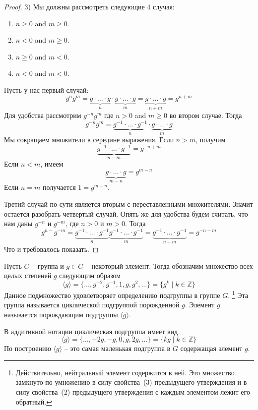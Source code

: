 \begin{proof}
3) Мы должны рассмотреть следующие $4$ случая:
\begin{enumerate}
\item $n\geqslant 0$ and $m\geqslant 0$.

\item $n < 0$ and $m\geqslant 0$.

\item $n\geqslant 0$ and $m < 0$.

\item $n < 0$ and $m < 0$.
\end{enumerate}
Пусть у нас первый случай:
\[
g^n g^m = \underbrace{g\cdot \ldots \cdot g}_n\cdot\underbrace{g\cdot \ldots \cdot g}_m = \underbrace{g\cdot \ldots \cdot g}_{n+m} = g^{n+m}
\]
Для удобства рассмотрим $g^{-n} g^{m}$ где $n>0$ and $m\geqslant 0$ во втором случае.
Тогда
\[
g^{-n}g^{m} = \underbrace{g^{-1}\cdot \ldots \cdot g^{-1}}_{n}\cdot\underbrace{g\cdot \ldots \cdot g}_m
\]
Мы сокращаем множители в середине выражения.
Если $n >m$, получим
\[
\underbrace{g^{-1}\cdot \ldots \cdot g^{-1}}_{n - m} = g^{-n + m}
\]
Если $n < m$, имеем
\[
\underbrace{g\cdot \ldots \cdot g}_{m - n} = g^{m - n}
\]
Если $n = m$ получается $1 = g^{m - n}$.

Третий случай по сути является вторым с переставленными множителями.
Значит остается разобрать четвертый случай.
Опять же для удобства будем считать, что нам даны $g^{-n}$ и $g^{-m}$, где $n>0$ и $m > 0$.
Тогда
\[
g^{n-} g^{-m} = \underbrace{g^{-1}\cdot \ldots \cdot g^{-1}}_{n}\underbrace{g^{-1}\cdot \ldots \cdot g^{-1}}_{m} = \underbrace{g^{-1}\cdot \ldots \cdot g^{-1}}_{n + m} = g^{-n - m}
\]
Что и требовалось показать.
\end{proof}


\begin{definition}
Пусть $G$ -- группа и $g\in G$ -- некоторый элемент.
Тогда обозначим множество всех целых степеней $g$ следующим образом
\[
\langle g \rangle = \{ \ldots, g^{-2},g^{-1},1, g, g^2, \ldots\} = \{g^k \mid k\in \mathbb Z\}
\]
Данное подмножество удовлетворяет определению подгруппы в группе $G$.%
\footnote{Действительно, нейтральный элемент содержится в ней.
Это множество замкнуто по умножению в силу свойства~(3) предыдущего утверждения и в силу свойства~(2) предыдущего утверждения с каждым элементом лежит его обратный.}
Эта группа называется циклической подгруппой порожденной $g$.
Элемент $g$ называется порождающим подгруппы $\langle g\rangle$.
\end{definition}

В аддитивной нотации циклическая подгруппа имеет вид
\[
\langle g\rangle = \{\ldots, -2 g, - g , 0, g, 2g, \ldots\} = \{kg\mid k \in \mathbb Z\}
\]
По построению $\langle g\rangle$ -- это самая маленькая подгруппа в $G$ содержащая элемент $g$.



